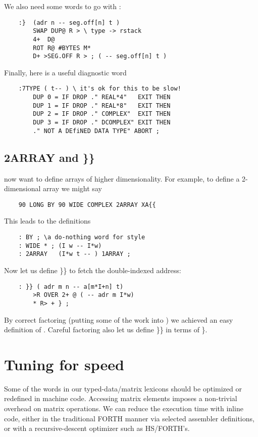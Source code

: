 We also need some words to go with :
\begin{lstlisting}
    :}  (adr n -- seg.off[n] t )
        SWAP DUP@ R > \ type -> rstack
        4+  D@
        ROT R@ #BYTES M*
        D+ >SEG.OFF R > ; ( -- seg.off[n] t )
\end{lstlisting}

Finally, here is a useful diagnostic word

\begin{lstlisting}
    :7TYPE ( t-- ) \ it's ok for this to be slow!
        DUP 0 = IF DROP ." REAL*4"   EXIT THEN
        DUP 1 = IF DROP ." REAL*8"   EXIT THEN
        DUP 2 = IF DROP ." COMPLEX"  EXIT THEN
        DUP 3 = IF DROP ." DCOMPLEX" EXIT THEN
        ." NOT A DEfiNED DATA TYPE" ABORT ;
\end{lstlisting}

\subsection{2ARRAY and \}\} }
 now want to define arrays of higher dimensionality. For example, to define a 2-dimensional array we might say

\begin{lstlisting}
    90 LONG BY 90 WIDE COMPLEX 2ARRAY XA{{
\end{lstlisting}

This leads to the definitions
\begin{lstlisting}
    : BY ; \a do-nothing word for style
    : WIDE * ; (I w -- I*w)
    : 2ARRAY   (I*w t -- ) 1ARRAY ;
\end{lstlisting}

Now let us define \}\} to fetch the double-indexed address:

\begin{lstlisting}
    : }} ( adr m n -- a[m*I+n] t)
        >R OVER 2+ @ ( -- adr m I*w)
        * R> + } ;
\end{lstlisting}

By correct factoring (putting some of the work into ) we achieved an easy definition of . Careful factoring also let
us define \}\} in terms of \}.

\section{Tuning for speed}

Some of the words in our typed-data/matrix lexicons should be optimized or redefined in machine code. Accessing matrix elements imposes a non-trivial overhead on matrix operations. We can reduce the execution time with inline code, either in the traditional FORTH manner via selected assembler definitions, or with a recursive-descent optimizer such as HS/FORTH's.

